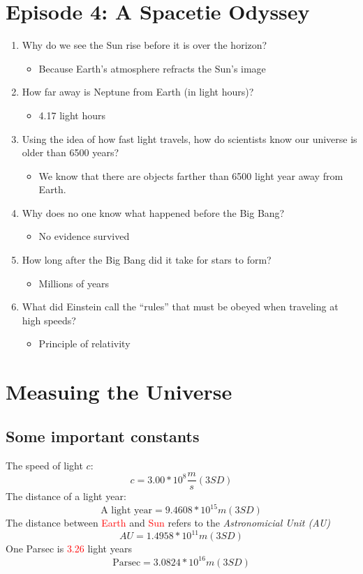 \section{Episode 4: A Spacetie Odyssey}
\begin{enumerate}
    \item Why do we see the Sun rise before it is over the horizon?
    \begin{itemize}
        \item Because Earth's atmosphere refracts the Sun's image
    \end{itemize}
    \item How far away is Neptune from Earth (in light hours)?
    \begin{itemize}
        \item 4.17 light hours
    \end{itemize}
    \item Using the idea of how fast light travels, how do scientists know our universe is older than 6500 years?
    \begin{itemize}
        \item We know that there are objects farther than 6500 light year away from Earth. 
    \end{itemize}
    \item Why does no one know what happened before the Big Bang?
    \begin{itemize}
        \item No evidence survived
    \end{itemize}
    \item How long after the Big Bang did it take for stars to form?
    \begin{itemize}
        \item Millions of years
    \end{itemize}
    \item What did Einstein call the “rules” that must be obeyed when traveling at high speeds?
    \begin{itemize}
        \item Principle of relativity
    \end{itemize}
\end{enumerate}

\section{Measuing the Universe}

\subsection{Some important constants}
The speed of light $c$:
\[
    c = 3.00 * 10^8\frac{m}{s} (3SD)
\]
The distance of a light year:
\[
    \text{A light year} = 9.4608 * 10^{15} m (3SD)
\]
The distance between \textcolor{red}{Earth} and \textcolor{red}{Sun} refers to the \textit{Astronomicial Unit (AU)}
\[
    AU = 1.4958 * 10^{11}m (3SD)
\]
One Parsec is \textcolor{red}{3.26} light years \[
\text{Parsec} = 3.0824 * 10^{16}m (3SD)
\]

